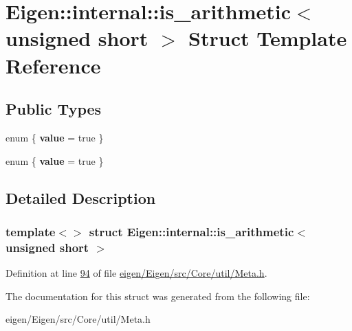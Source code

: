 \hypertarget{struct_eigen_1_1internal_1_1is__arithmetic_3_01unsigned_01short_01_4}{}\section{Eigen\+:\+:internal\+:\+:is\+\_\+arithmetic$<$ unsigned short $>$ Struct Template Reference}
\label{struct_eigen_1_1internal_1_1is__arithmetic_3_01unsigned_01short_01_4}
\subsection*{Public Types}
\begin{DoxyCompactItemize}
\item 
\mbox{\label{struct_eigen_1_1internal_1_1is__arithmetic_3_01unsigned_01short_01_4_aea59a3fc0343a7307fd75bc1c6586bf8}} 
enum \{ {\bfseries value} = true
 \}
\item 
\mbox{\label{struct_eigen_1_1internal_1_1is__arithmetic_3_01unsigned_01short_01_4_a9672b39b1dcf5feef8ec7158f2771bf0}} 
enum \{ {\bfseries value} = true
 \}
\end{DoxyCompactItemize}


\subsection{Detailed Description}
\subsubsection*{template$<$$>$\newline
struct Eigen\+::internal\+::is\+\_\+arithmetic$<$ unsigned short $>$}



Definition at line \hyperlink{eigen_2_eigen_2src_2_core_2util_2_meta_8h_source_l00094}{94} of file \hyperlink{eigen_2_eigen_2src_2_core_2util_2_meta_8h_source}{eigen/\+Eigen/src/\+Core/util/\+Meta.\+h}.



The documentation for this struct was generated from the following file\+:\begin{DoxyCompactItemize}
\item 
eigen/\+Eigen/src/\+Core/util/\+Meta.\+h\end{DoxyCompactItemize}
